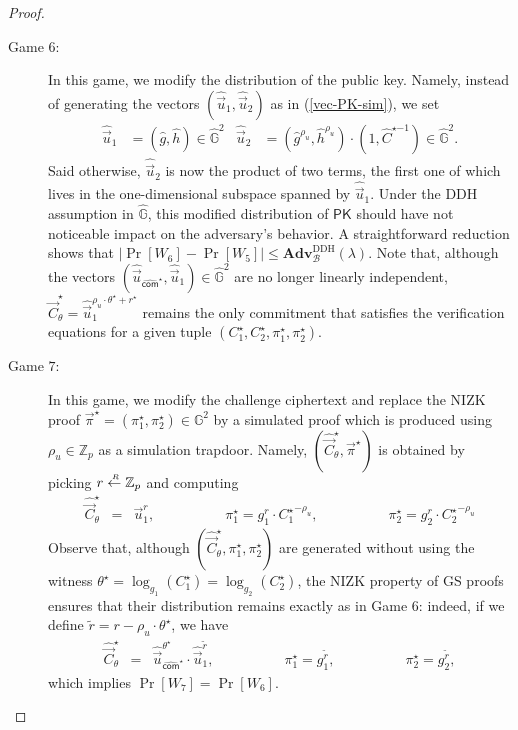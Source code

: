 \documentclass[10pt]{llncs}
\newcommand{\B}{\mathcal{B}}
\newcommand{\G}{\mathbb{G}}
\newcommand{\Z}{\mathbb{Z}}
\newcommand{\PK}{\mathsf{PK}}
\newcommand{\com}{\hat{\mathsf{com}}}
\newcommand{\sample}{\stackrel{{\scriptscriptstyle \mkern4mu R}}{\gets}}
\begin{document}
\begin{proof}
\begin{description}
  \item[\textsf{Game} $6$:] In this game, we modify the distribution of the public key.  Namely, instead of generating 
    the vectors $(\hat{\vec{u}}_1, \hat{\vec{u}}_2)$ as in (\ref{vec-PK-sim}), we 
    set 
    \begin{align} \label{vec-PK-sim-bis} 
      \hat{\vec{u}}_1 & = (\hat{g}, \hat{h}) \in \hat{\G}^2  &
      \hat{\vec{u}}_2 & = (\hat{g}^{\rho_u}, \hat{h}^{\rho_u}) 
                          \cdot (1,{\hat{C}^{\star{-1}}})  \in \hat{\G}^2.
    \end{align}
    Said otherwise,  $\hat{\vec{u}}_2$ is now the product of two terms, the first one of which lives in the 
    one-dimensional subspace spanned by $\hat{\vec{u}}_1$. Under the DDH assumption in $\hat{\G}$, this modified  
    distribution of $\PK$ should have not noticeable impact on the adversary's behavior.  
    A straightforward reduction shows 
    that $|\Pr[W_6]-\Pr[W_5] | \leq \mathbf{Adv}^{\mathrm{DDH}}_\B (\lambda)$. Note that, although the vectors $(\hat{\vec{u}}_{\com^\star},\hat{\vec{u}}_1) \in \hat{\G}^2$ are 
    no longer linearly independent, $\hat{\vec{C}}_{\theta}^\star = \hat{\vec{u}}_1^{\rho_u \cdot \theta^\star +r^\star}$ remains the only commitment 
    that satisfies the verification equations  for a given tuple $(C_1^\star,C_2^\star,\pi_1^\star,\pi_2^\star)$.
    

    \smallskip \smallskip 

  \item[\textsf{Game} $7$:] In this game, we  modify the challenge ciphertext and replace the NIZK proof $\vec{\pi}^\star=(\pi_1^\star,\pi_2^\star) \in \G^2$ by a simulated proof which is produced 
    using $\rho_u \in \Z_p$ as a simulation trapdoor. Namely, $(\hat{\vec{C}}_\theta^\star,\vec{\pi}^\star)$ is obtained by picking $r \sample \Z_p$ and  computing
    \begin{eqnarray*}
      \hat{\vec{C}}_{\theta}^\star &=& \vec{u}_1^{r},   \qquad \qquad \quad
                                 \pi_1^\star  =  g_1^{r} \cdot {C_1^\star }^{-\rho_u} , \qquad \qquad \quad 
                                 \pi_2^\star  =  g_2^{r} \cdot {C_2^\star }^{-\rho_u}
    \end{eqnarray*}
    Observe that, although $(\hat{\vec{C}}_\theta^\star,\pi_1^\star,\pi_2^\star)$ are generated without using the 
		witness $\theta^\star = \log_{g_1}(C_1^\star) =
    \log_{g_2}(C_2^\star)$,  the NIZK property of 
    GS proofs ensures that 
    their distribution remains exactly as in Game $6$: indeed, if we define $\tilde{r} =r -\rho_u \cdot \theta^\star$, we have
    \begin{eqnarray*}
      \hat{\vec{C}}_{\theta}^\star &=& \hat{\vec{u}}_{\com^\star}^{\theta^\star} \cdot \hat{\vec{u}}_1^{\tilde{r}},   \qquad \qquad \quad
                                 \pi_1^\star  =  g_1^{\tilde{r}} , \qquad \qquad \quad 
                                 \pi_2^\star  =  g_2^{\tilde{r}} ,
    \end{eqnarray*}
    which implies $\Pr[W_7]=\Pr[W_6]$.  
    \smallskip \smallskip



\end{description}
\end{proof}
\end{document}
